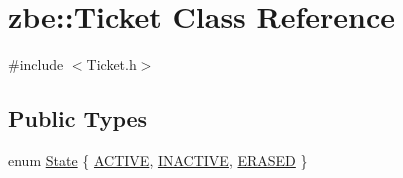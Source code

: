 \hypertarget{classzbe_1_1_ticket}{}\section{zbe\+:\+:Ticket Class Reference}
\label{classzbe_1_1_ticket}


{\ttfamily \#include $<$Ticket.\+h$>$}

\subsection*{Public Types}
\begin{DoxyCompactItemize}
\item 
enum \hyperlink{classzbe_1_1_ticket_a8325e68db1e22dd969cc089bac3b1c3c}{State} \{ \hyperlink{classzbe_1_1_ticket_a8325e68db1e22dd969cc089bac3b1c3ca9a9c7fb95522615209a8db441eae9e53}{A\+C\+T\+I\+V\+E}, 
\hyperlink{classzbe_1_1_ticket_a8325e68db1e22dd969cc089bac3b1c3cafe4b1fdf81c91c449f0325de0ee46559}{I\+N\+A\+C\+T\+I\+V\+E}, 
\hyperlink{classzbe_1_1_ticket_a8325e68db1e22dd969cc089bac3b1c3caf97068955399e6f40421564c7c2f100f}{E\+R\+A\+S\+E\+D}
 \}
\end{DoxyCompactItemize}
